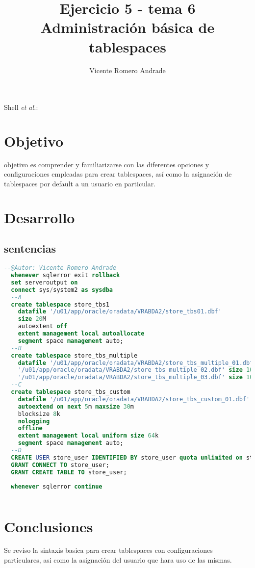 \documentclass[journal]{IEEEtran}
\begin{document}
\title{Ejercicio 5 - tema 6 \\ Administración básica de tablespaces}
%
\author{Vicente Romero Andrade}

%
{Shell \MakeLowercase{\textit{et al.}}: }

\maketitle


\IEEEpeerreviewmaketitle

\section{Objetivo}

 objetivo es comprender y familiarizarse con las diferentes opciones y configuraciones 
empleadas para crear tablespaces, así como la asignación de tablespaces por default a un usuario en particular.
\section{Desarrollo}
\subsection{sentencias}
\begin{lstlisting}[language=sql, caption=s-00-crea-tablespace.sql,label={lst:codigo1}]
  --@Autor: Vicente Romero Andrade
  whenever sqlerror exit rollback
  set serveroutput on
  connect sys/system2 as sysdba
  --A
  create tablespace store_tbs1 
    datafile '/u01/app/oracle/oradata/VRABDA2/store_tbs01.dbf' 
    size 20M
    autoextent off
    extent management local autoallocate
    segment space management auto;
  --B
  create tablespace store_tbs_multiple
    datafile '/u01/app/oracle/oradata/VRABDA2/store_tbs_multiple_01.dbf' size 10M,
    '/u01/app/oracle/oradata/VRABDA2/store_tbs_multiple_02.dbf' size 10M,
    '/u01/app/oracle/oradata/VRABDA2/store_tbs_multiple_03.dbf' size 10M;
  --C
  create tablespace store_tbs_custom
    datafile '/u01/app/oracle/oradata/VRABDA2/store_tbs_custom_01.dbf' size 10M reuse
    autoextend on next 5m maxsize 30m
    blocksize 8k
    nologging
    offline
    extent management local uniform size 64k
    segment space management auto;
  --D
  CREATE USER store_user IDENTIFIED BY store_user quota unlimited on store_tbs1 default tablespace store_tbs1;
  GRANT CONNECT TO store_user;
  GRANT CREATE TABLE TO store_user;
  
  whenever sqlerror continue
  
\end{lstlisting}
\section{Conclusiones}
Se reviso la sintaxis basica para crear tablespaces con configuraciones particulares, asi como la asignación del usuario 
que hara uso de las mismas.
\ifCLASSOPTIONcaptionsoff
  \newpage

\fi
\end{document}
